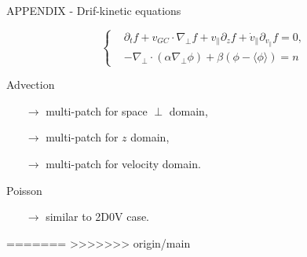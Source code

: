 \documentclass[
	english,%
	logo=false,%
	eurofusion=false, %
	titlegraphic=true, %
	]{ippbeamer}
\begin{document}
\begin{frame}{APPENDIX - Drif-kinetic equations}
\vspace*{0.5cm}
\scriptsize

\begin{equation}
\left\{
\begin{aligned}
	&\partial_t f 
		+ v_{GC}\cdot \nabla_{\perp}f 
		+ v_{\parallel} \partial_z f 
		+ \dot{v}_{\parallel} \partial_{v_{\parallel}} f
		= 0, \\
	&-\nabla_{\perp} \cdot (\alpha\nabla_{\perp} \phi) + \beta (\phi - \langle\phi\rangle) = n
\end{aligned}
\right.
\end{equation}

\vspace*{0.5cm}
Advection
\begin{itemize}
	\item[$\rightarrow$] multi-patch for space $\perp$ domain, 
	\item[$\rightarrow$] multi-patch for $z$ domain, 
	\item[$\rightarrow$] multi-patch for velocity domain.
\end{itemize}

\vspace*{0.25cm}
Poisson
\begin{itemize}
	\item[$\rightarrow$] similar to 2D0V case.
\end{itemize}
\end{frame}

=======
>>>>>>> origin/main
\end{document}
